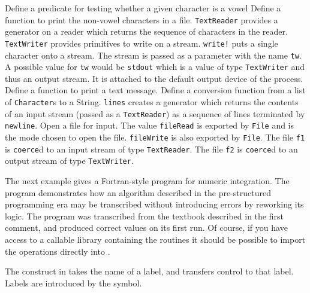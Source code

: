 \begin{description}
 Define a predicate for testing whether a given character
is a vowel
 Define a function to print the non-vowel characters in a
file. 
 {\tt TextReader} provides a generator on a reader which
returns the sequence of characters in the reader. {\tt TextWriter}
provides primitives to write on a stream.
 {\tt write!} puts a single character onto a stream.
The stream is passed as a parameter with the name {\tt tw}. A
possible value for {\tt tw} would be {\tt stdout} which is a value
of type {\tt TextWriter} and thus an output stream. It is attached
to the default output device of the process.
 Define a function to print a text message.
 Define a conversion function from a list of {\tt Character}s
to a String.
 {\tt lines} creates a generator which returns the
contents of an input stream (passed as a {\tt TextReader}) as a
sequence of lines terminated by {\tt newline}.
 Open a file for input. The value {\tt fileRead} is exported
by {\tt File} and is the mode chosen to open the file.
 {\tt fileWrite} is also exported by {\tt File}.
 The file {\tt f1} is \verb+coerce+d to an input stream of
type {\tt TextReader}.
 The file {\tt f2} is \verb+coerce+d to an output stream of
type {\tt TextWriter}.
\end{description}


\newpage
{}

The next example gives a Fortran-style program for numeric
integration. The program demonstrates how an algorithm described in
the pre-structured programming era may be transcribed without
introducing errors by reworking its logic. The program was transcribed
from the textbook described in the first comment, and produced correct
values on its first run. Of course, if you have access to a callable
library containing the routines it should be possible to import the
operations directly into \asharp{}.

The  construct in \asharp{} takes the name of a label, and
transfers control to that label. Labels are introduced by the
 symbol.



